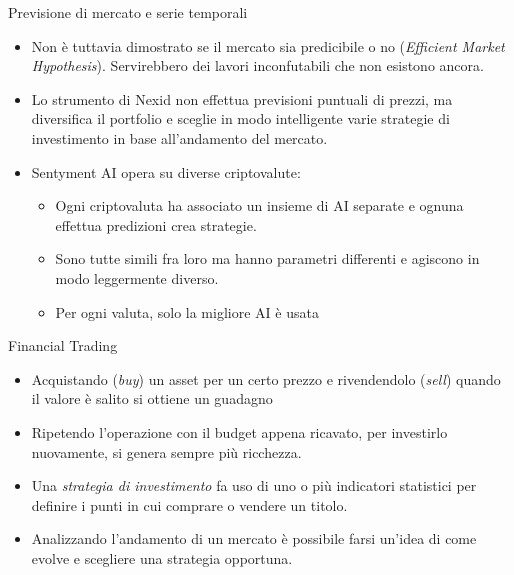 \documentclass{beamer}
\begin{document}
\begin{frame}{Previsione di mercato e serie temporali}
\begin{itemize}
\item Non è tuttavia dimostrato se il mercato sia predicibile o no (\textit{Efficient Market Hypothesis}).
Servirebbero dei lavori inconfutabili che non esistono ancora.
\item Lo strumento di Nexid non effettua previsioni puntuali di prezzi, ma diversifica il portfolio e sceglie in modo intelligente varie strategie di investimento in base all'andamento del mercato.
\item Sentyment AI opera su diverse criptovalute:
\begin{itemize}
    \item Ogni criptovaluta ha associato un insieme di AI separate e ognuna effettua predizioni crea strategie. \item Sono tutte simili fra loro ma hanno parametri differenti e agiscono in modo leggermente diverso.
    \item Per ogni valuta, solo la migliore AI è usata
\end{itemize}
\end{itemize}
\end{frame}

\begin{frame}{Financial Trading}
\begin{itemize}
    \item Acquistando (\textit{buy}) un asset per un certo prezzo e rivendendolo (\textit{sell}) quando il valore è salito si ottiene un guadagno
    \item Ripetendo l'operazione con il budget appena ricavato, per investirlo nuovamente, si genera sempre più ricchezza. 
    \item Una \textit{strategia di investimento} fa uso di uno o più indicatori statistici per definire i punti in cui comprare o vendere un titolo.
    \item Analizzando l'andamento di un mercato è possibile farsi un'idea di come evolve e scegliere una strategia opportuna.
    \begin{figure}
\end{figure}
\end{itemize}
\end{frame}
\end{document}

